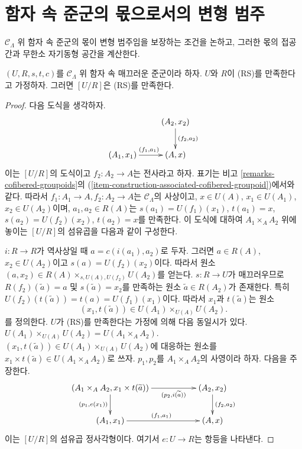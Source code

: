 \section{함자 속 준군의 몫으로서의 변형 범주}
\label{section-deformation-categories-as-quotients}

\noindent
$\mathcal{C}_\Lambda$ 위 함자 속 준군의 몫이 변형 범주임을 보장하는
조건을 논하고, 그러한 몫의 접공간과 무한소 자기동형 공간을 계산한다.

\begin{lemma}
\label{lemma-smooth-RS-groupoid-in-functors-quotient}
$(U, R, s, t, c)$를 $\mathcal{C}_\Lambda$ 위 함자 속 매끄러운 준군이라
하자. $U$와 $R$이 (RS)를 만족한다고 가정하자. 그러면 $[U/R]$은
(RS)를 만족한다.
\end{lemma}

\begin{proof}
다음 도식을 생각하자.
$$
\xymatrix{
                           &     (A_2, x_2) \ar[d]^{(f_2, a_2)} \\
(A_1, x_1) \ar[r]^{(f_1, a_1)} &     (A, x)
}
$$
이는 $[U/R]$의 도식이고 $f_2: A_2 \to A$는 전사라고 하자.
표기는 비고 \ref{remarks-cofibered-groupoids}의
(\ref{item-construction-associated-cofibered-groupoid})에서와 같다.
따라서 $f_1: A_1 \to A, f_2: A_2 \to A$는
$\mathcal{C}_\Lambda$의 사상이고, $x \in U(A)$,
$x_1 \in U(A_1)$, $x_2 \in U(A_2)$이며,
$a_1, a_2 \in R(A)$는 $s(a_1) = U(f_1)(x_1)$,
$t(a_1) = x$, $s(a_2) = U(f_2)(x_2)$, $t(a_2) = x$를 만족한다.
이 도식에 대하여 $A_1 \times_A A_2$ 위에 놓이는 $[U/R]$의
섬유곱을 다음과 같이 구성한다.

\medskip\noindent
$i: R \to R$가 역사상일 때 $a = c(i(a_1), a_2)$로 두자.
그러면 $a \in R(A)$, $x_2 \in U(A_2)$이고
$s(a) = U(f_2)(x_2)$이다. 따라서 원소
$(a, x_2) \in R(A) \times_{s, U(A), U(f_2)} U(A_2)$를 얻는다.
$s : R \to U$가 매끄러우므로
$R(f_2)(\widetilde{a}) = a$ 및 $s(\widetilde{a}) = x_2$를 만족하는
원소 $\widetilde{a} \in R(A_2)$가 존재한다. 특히
$U(f_2)(t(\widetilde{a})) = t(a) = U(f_1)(x_1)$이다. 따라서
$x_1$과 $t(\widetilde{a})$는 원소
$$
(x_1, t(\widetilde{a})) \in U(A_1) \times_{U(A)} U(A_2).
$$
를 정의한다. $U$가 (RS)를 만족한다는 가정에 의해 다음 동일시가 있다.
$U(A_1) \times_{U(A)} U(A_2) = U(A_1 \times_A A_2)$.
$(x_1, t(\widetilde{a})) \in U(A_1) \times_{U(A)} U(A_2)$에 대응하는
원소를 $x_1 \times t(\widetilde{a}) \in U(A_1 \times_A A_2)$로 쓰자.
$p_1, p_2$를 $A_1 \times_A A_2$의 사영이라 하자. 다음을 주장한다.
$$
\xymatrix{
(A_1 \times_A A_2, x_1 \times t(\widetilde{a})) \ar[d]_{(p_1, e(x_1))}
\ar[rr]_-{(p_2, i(\widetilde{a}))} & & (A_2, x_2) \ar[d]^{(f_2, a_2)} \\
(A_1, x_1) \ar[rr]^{(f_1, a_1)} & & (A, x)
}
$$
이는 $[U/R]$의 섬유곱 정사각형이다. 여기서
$e: U \to R$는 항등을 나타낸다.


\end{proof}
